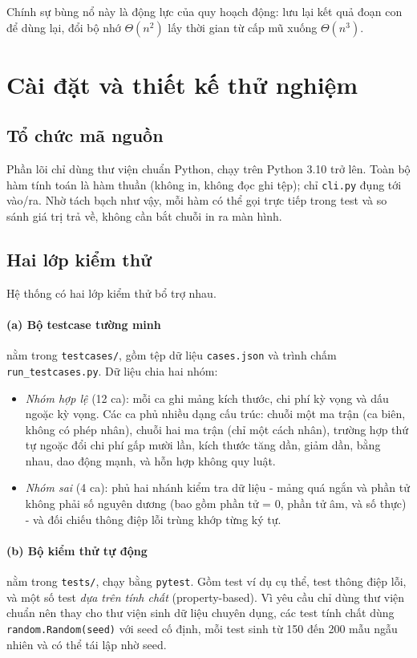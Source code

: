 \documentclass[12pt,a4paper]{article}
\begin{document}
Chính sự bùng nổ này là động lực của quy hoạch động: lưu lại kết quả đoạn con để dùng lại, đổi bộ nhớ $\Theta(n^2)$ lấy thời gian từ cấp mũ xuống $\Theta(n^3)$.

\section{Cài đặt và thiết kế thử nghiệm}
\label{sec:testing}

\subsection{Tổ chức mã nguồn}
Phần lõi chỉ dùng thư viện chuẩn Python, chạy trên Python 3.10 trở lên. Toàn bộ hàm tính toán là hàm thuần (không in, không đọc ghi tệp); chỉ \texttt{cli.py} đụng tới vào/ra. Nhờ tách bạch như vậy, mỗi hàm có thể gọi trực tiếp trong test và so sánh giá trị trả về, không cần bắt chuỗi in ra màn hình.

\subsection{Hai lớp kiểm thử}
Hệ thống có hai lớp kiểm thử bổ trợ nhau.

\paragraph{(a) Bộ testcase tường minh} nằm trong \texttt{testcases/}, gồm tệp dữ liệu \texttt{cases.json} và trình chấm \texttt{run\_testcases.py}. Dữ liệu chia hai nhóm:
\begin{itemize}
  \item \emph{Nhóm hợp lệ} (12 ca): mỗi ca ghi mảng kích thước, chi phí kỳ vọng và dấu ngoặc kỳ vọng. Các ca phủ nhiều dạng cấu trúc: chuỗi một ma trận (ca biên, không có phép nhân), chuỗi hai ma trận (chỉ một cách nhân), trường hợp thứ tự ngoặc đổi chi phí gấp mười lần, kích thước tăng dần, giảm dần, bằng nhau, dao động mạnh, và hỗn hợp không quy luật.
  \item \emph{Nhóm sai} (4 ca): phủ hai nhánh kiểm tra dữ liệu - mảng quá ngắn và phần tử không phải số nguyên dương (bao gồm phần tử = 0, phần tử âm, và số thực) - và đối chiếu thông điệp lỗi trùng khớp từng ký tự.
\end{itemize}

\paragraph{(b) Bộ kiểm thử tự động} nằm trong \texttt{tests/}, chạy bằng \texttt{pytest}. Gồm test ví dụ cụ thể, test thông điệp lỗi, và một số test \emph{dựa trên tính chất} (property-based). Vì yêu cầu chỉ dùng thư viện chuẩn nên thay cho thư viện sinh dữ liệu chuyên dụng, các test tính chất dùng \texttt{random.Random(seed)} với seed cố định, mỗi test sinh từ 150 đến 200 mẫu ngẫu nhiên và có thể tái lập nhờ seed.
\end{document}
